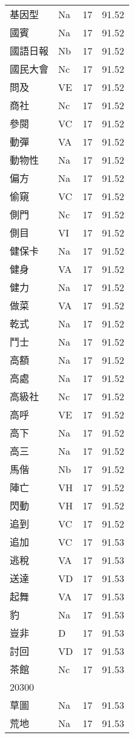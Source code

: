 \documentclass[twocolumn]{book}
\begin{document}
\begin{supertabular}{llrr}
基因型 & Na & 17 &  91.52\\
國賓 & Na & 17 &  91.52\\
國語日報 & Nb & 17 &  91.52\\
國民大會 & Nc & 17 &  91.52\\
問及 & VE & 17 &  91.52\\
商社 & Nc & 17 &  91.52\\
參閱 & VC & 17 &  91.52\\
動彈 & VA & 17 &  91.52\\
動物性 & Na & 17 &  91.52\\
偏方 & Na & 17 &  91.52\\
偷窺 & VC & 17 &  91.52\\
側門 & Nc & 17 &  91.52\\
側目 & VI & 17 &  91.52\\
健保卡 & Na & 17 &  91.52\\
健身 & VA & 17 &  91.52\\
健力 & Na & 17 &  91.52\\
做菜 & VA & 17 &  91.52\\
乾式 & Na & 17 &  91.52\\
鬥士 & Na & 17 &  91.52\\
高額 & Na & 17 &  91.52\\
高處 & Na & 17 &  91.52\\
高級社 & Nc & 17 &  91.52\\
高呼 & VE & 17 &  91.52\\
高下 & Na & 17 &  91.52\\
高三 & Na & 17 &  91.52\\
馬偕 & Nb & 17 &  91.52\\
陣亡 & VH & 17 &  91.52\\
閃動 & VH & 17 &  91.52\\
追到 & VC & 17 &  91.52\\
追加 & VC & 17 &  91.53\\
逃稅 & VA & 17 &  91.53\\
送達 & VD & 17 &  91.53\\
起舞 & VA & 17 &  91.53\\
豹 & Na & 17 &  91.53\\
豈非 & D & 17 &  91.53\\
討回 & VD & 17 &  91.53\\
茶館 & Nc & 17 &  91.53\\
20300\\
草圖 & Na & 17 &  91.53\\
荒地 & Na & 17 &  91.53\\

\end{supertabular}
\end{document}
